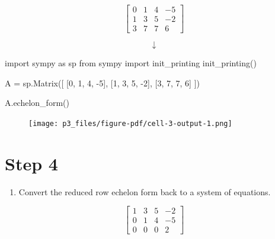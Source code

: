 \documentclass[
  letterpaper,
  DIV=11,
  numbers=noendperiod]{scrreprt}
\newenvironment{Shaded}{\begin{snugshade}}{\end{snugshade}}
\newcommand{\DecValTok}[1]{\textcolor[rgb]{0.68,0.00,0.00}{#1}}
\newcommand{\ImportTok}[1]{\textcolor[rgb]{0.00,0.46,0.62}{#1}}
\newcommand{\NormalTok}[1]{\textcolor[rgb]{0.00,0.23,0.31}{#1}}
\newcommand{\OperatorTok}[1]{\textcolor[rgb]{0.37,0.37,0.37}{#1}}
\providecommand{\tightlist}{%
  \setlength{\itemsep}{0pt}\setlength{\parskip}{0pt}}\usepackage{longtable,booktabs,array}
\begin{document}
\[
\left[\begin{array}{ccc|c}
0 & 1 & 4 & -5 \\
1 & 3 & 5 & -2 \\
3 & 7 & 7 & 6
\end{array}\right]
\]

\[
\downarrow
\]

\begin{Shaded}
\begin{Highlighting}[]
\ImportTok{import}\NormalTok{ sympy }\ImportTok{as}\NormalTok{ sp  }
\ImportTok{from}\NormalTok{ sympy }\ImportTok{import}\NormalTok{ init\_printing}
\NormalTok{init\_printing()}

\NormalTok{A }\OperatorTok{=}\NormalTok{ sp.Matrix([}
\NormalTok{    [}\DecValTok{0}\NormalTok{, }\DecValTok{1}\NormalTok{, }\DecValTok{4}\NormalTok{, }\OperatorTok{{-}}\DecValTok{5}\NormalTok{],}
\NormalTok{    [}\DecValTok{1}\NormalTok{, }\DecValTok{3}\NormalTok{, }\DecValTok{5}\NormalTok{, }\OperatorTok{{-}}\DecValTok{2}\NormalTok{],}
\NormalTok{    [}\DecValTok{3}\NormalTok{, }\DecValTok{7}\NormalTok{, }\DecValTok{7}\NormalTok{, }\DecValTok{6}\NormalTok{]}
\NormalTok{])}

\NormalTok{A.echelon\_form()}
\end{Highlighting}
\end{Shaded}

\begin{figure}[H]

{\centering \texttt{[image: p3\_files/figure-pdf/cell-3-output-1.png]}

}

\end{figure}

\chapter{Step 4}

\begin{enumerate}
\def\labelenumi{\arabic{enumi}.}
\setcounter{enumi}{3}
\tightlist
\item
  Convert the reduced row echelon form back to a system of equations.
\end{enumerate}

\[
\displaystyle \left[\begin{matrix}1 & 3 & 5 & -2\\0 & 1 & 4 & -5\\0 & 0 & 0 & 2\end{matrix}\right]
\]
\end{document}
